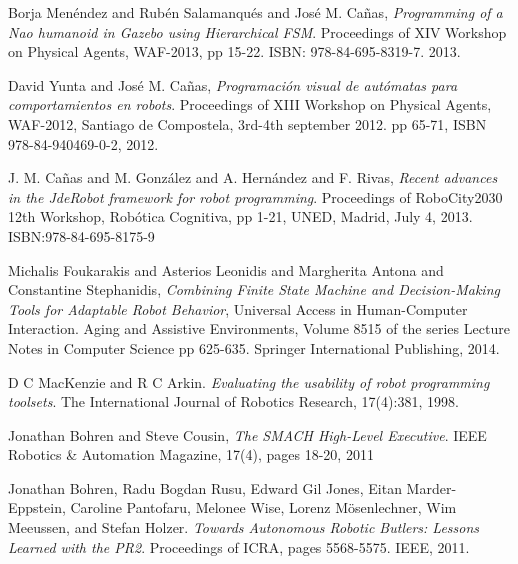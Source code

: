 \documentclass[journal,twoside]{JoPhA}
\begin{document}
\begin{thebibliography}{1}


Borja Men\'endez and Rubén Salamanqu\'es and Jos\'e M. Ca\~nas, \emph{Programming of a Nao humanoid in Gazebo using Hierarchical FSM}.  Proceedings of XIV Workshop on Physical Agents, WAF-2013, pp 15-22. ISBN: 978-84-695-8319-7. 2013.

David Yunta and Jos\'e M. Cañas, \emph{Programación visual de autómatas para comportamientos en robots}.  Proceedings of XIII Workshop on Physical Agents, WAF-2012, Santiago de Compostela, 3rd-4th september 2012. pp 65-71, ISBN 978-84-940469-0-2, 2012.

J. M. Ca\~nas and M. Gonz\'alez and A. Hern\'andez and F. Rivas, \emph{Recent advances in the JdeRobot framework for robot programming}. Proceedings of RoboCity2030 12th Workshop, Rob\'otica Cognitiva, pp 1-21, UNED, Madrid, July 4, 2013. ISBN:978-84-695-8175-9


Michalis Foukarakis and Asterios Leonidis and Margherita Antona and Constantine Stephanidis, \emph{Combining Finite State Machine and Decision-Making Tools for Adaptable Robot Behavior}, Universal Access in Human-Computer Interaction. Aging and Assistive Environments, Volume 8515 of the series Lecture Notes in Computer Science pp 625-635. Springer International Publishing, 2014.

D C MacKenzie and R C Arkin. \emph{Evaluating the usability of robot programming toolsets}. The International Journal of Robotics Research, 17(4):381, 1998.

Jonathan Bohren and Steve Cousin, \emph{The SMACH High-Level Executive}. IEEE Robotics \& Automation Magazine, 17(4), pages 18-20, 2011

Jonathan Bohren, Radu Bogdan Rusu, Edward Gil Jones, Eitan Marder-Eppstein, Caroline Pantofaru, Melonee Wise, Lorenz Mösenlechner, Wim Meeussen, and Stefan Holzer. \emph{Towards  Autonomous  Robotic  Butlers:  Lessons  Learned  with  the  PR2}. Proceedings of ICRA, pages 5568-5575. IEEE, 2011.


\end{thebibliography}
\end{document}
